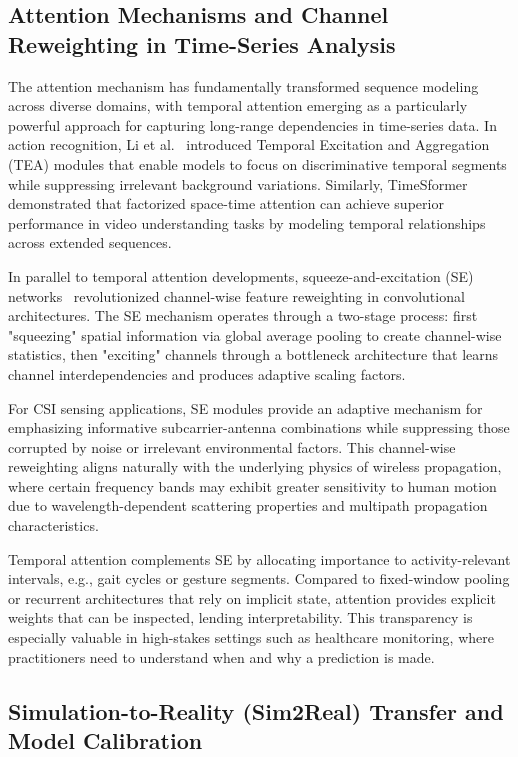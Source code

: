 \documentclass[lettersize,journal]{IEEEtran}
\begin{document}
\subsection{Attention Mechanisms and Channel Reweighting in Time-Series Analysis}

The attention mechanism has fundamentally transformed sequence modeling across diverse domains, with temporal attention emerging as a particularly powerful approach for capturing long-range dependencies in time-series data. In action recognition, Li et al.~\cite{li2020tea} introduced Temporal Excitation and Aggregation (TEA) modules that enable models to focus on discriminative temporal segments while suppressing irrelevant background variations. Similarly, TimeSformer~\cite{bertasius2021timesformer} demonstrated that factorized space-time attention can achieve superior performance in video understanding tasks by modeling temporal relationships across extended sequences.

In parallel to temporal attention developments, squeeze-and-excitation (SE) networks~\cite{se_networks2018} revolutionized channel-wise feature reweighting in convolutional architectures. The SE mechanism operates through a two-stage process: first "squeezing" spatial information via global average pooling to create channel-wise statistics, then "exciting" channels through a bottleneck architecture that learns channel interdependencies and produces adaptive scaling factors.

For CSI sensing applications, SE modules provide an adaptive mechanism for emphasizing informative subcarrier-antenna combinations while suppressing those corrupted by noise or irrelevant environmental factors. This channel-wise reweighting aligns naturally with the underlying physics of wireless propagation, where certain frequency bands may exhibit greater sensitivity to human motion due to wavelength-dependent scattering properties and multipath propagation characteristics.

Temporal attention complements SE by allocating importance to activity-relevant intervals, e.g., gait cycles or gesture segments. Compared to fixed-window pooling or recurrent architectures that rely on implicit state, attention provides explicit weights that can be inspected, lending interpretability. This transparency is especially valuable in high-stakes settings such as healthcare monitoring, where practitioners need to understand when and why a prediction is made.

\subsection{Simulation-to-Reality (Sim2Real) Transfer and Model Calibration}
\end{document}
